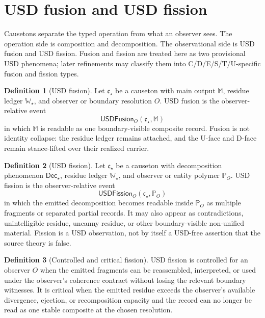 \documentclass[11pt]{article}
\newcommand{\Dec}{\mathsf{Dec}}
\newcommand{\USDFusion}{\mathsf{USDFusion}}
\newcommand{\USDFission}{\mathsf{USDFission}}
\theoremstyle{definition}
\newtheorem{definition}{Definition}[section]
\theoremstyle{plain}
\begin{document}
\section{USD fusion and USD fission}

Causetons separate the typed operation from what an observer sees.  The
operation side is composition and decomposition.  The observational side
is USD fusion and USD fission.  Fusion and fission are treated here as two
provisional USD phenomena; later refinements may classify them into
C/D/E/S/T/U-specific fusion and fission types.

\begin{definition}[USD fusion]
Let \(\mathfrak c_\star\) be a causeton with main output \(\mathbb M\),
residue ledger \(\mathbb W_\star\), and observer or boundary resolution
\(O\).  USD fusion is the observer-relative event
\[
  \USDFusion_O(\mathfrak c_\star,\mathbb M)
\]
in which \(\mathbb M\) is readable as one boundary-visible composite
record.  Fusion is not identity collapse: the residue ledger remains
attached, and the U-face and D-face remain stance-lifted over their
realized carrier.
\end{definition}

\begin{definition}[USD fission]
Let \(\mathfrak c_\star\) be a causeton with decomposition phenomenon
\(\Dec_\star\), residue ledger \(\mathbb W_\star\), and observer or entity
polymer \(\mathbb P_O\).  USD fission is the observer-relative event
\[
  \USDFission_O(\mathfrak c_\star,\mathbb P_O)
\]
in which the emitted decomposition becomes readable inside \(\mathbb P_O\)
as multiple fragments or separated partial records.  It may also appear as
contradictions, unintelligible residue, uncanny residue, or other
boundary-visible non-unified material.  Fission is a USD observation, not
by itself a USD-free assertion that the source theory is false.
\end{definition}

\begin{definition}[Controlled and critical fission]
USD fission is controlled for an observer \(O\) when the emitted fragments
can be reassembled, interpreted, or used under the observer's coherence
contract without losing the relevant boundary witnesses.  It is critical
when the emitted residue exceeds the observer's available divergence,
ejection, or recomposition capacity and the record can no longer be read as
one stable composite at the chosen resolution.
\end{definition}
\end{document}
